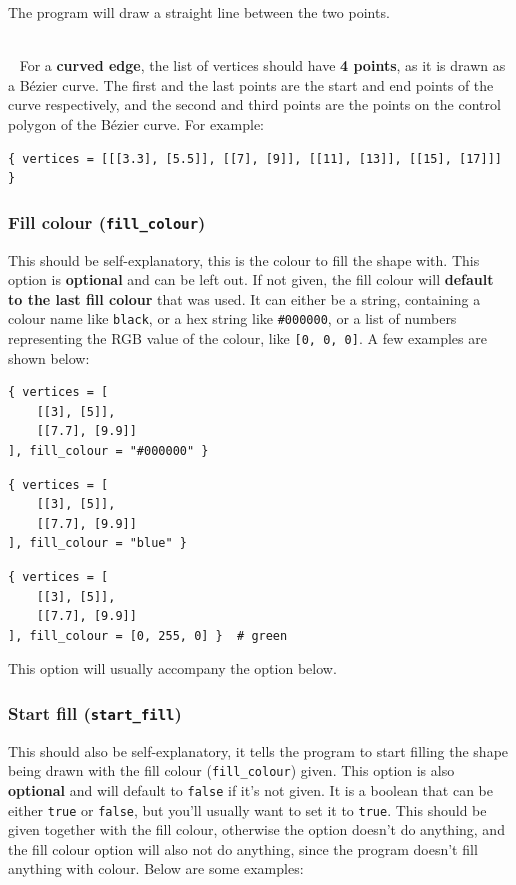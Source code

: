 \documentclass[11pt]{article}
\begin{document}
 \noindent The program will draw a straight line between the two points.

 ~\\~ \noindent For a \textbf{curved edge}, the list of vertices should have \textbf{4 points}, as it is drawn as a Bézier curve. The first and the last points are the start and end points of the curve respectively, and the second and third points are the points on the control polygon of the Bézier curve. For example:
\begin{verbatim}
{ vertices = [[[3.3], [5.5]], [[7], [9]], [[11], [13]], [[15], [17]]] }
\end{verbatim}

 \newpage

\subsubsection{Fill colour (\texttt{fill\_colour})}
\label{sec:orgc4d6a22}
This should be self-explanatory, this is the colour to fill the shape with. This option is \textbf{optional} and can be left out. If not given, the fill colour will \textbf{default to the last fill colour} that was used. It can either be a string, containing a colour name like \texttt{black}, or a hex string like \texttt{\#000000}, or a list of numbers representing the RGB value of the colour, like \texttt{[0, 0, 0]}. A few examples are shown below:

\begin{verbatim}
{ vertices = [
    [[3], [5]],
    [[7.7], [9.9]]
], fill_colour = "#000000" }
\end{verbatim}

\begin{verbatim}
{ vertices = [
    [[3], [5]],
    [[7.7], [9.9]]
], fill_colour = "blue" }
\end{verbatim}

\begin{verbatim}
{ vertices = [
    [[3], [5]],
    [[7.7], [9.9]]
], fill_colour = [0, 255, 0] }  # green
\end{verbatim}

 \noindent This option will usually accompany the option below.

 \newpage

\subsubsection{Start fill (\texttt{start\_fill})}
\label{sec:orgcbbf55f}
This should also be self-explanatory, it tells the program to start filling the shape being drawn with the fill colour (\texttt{fill\_colour}) given. This option is also \textbf{optional} and will default to \texttt{false} if it's not given. It is a boolean that can be either \texttt{true} or \texttt{false}, but you'll usually want to set it to \texttt{true}. This should be given together with the fill colour, otherwise the option doesn't do anything, and the fill colour option will also not do anything, since the program doesn't fill anything with colour. Below are some examples:
\end{document}
